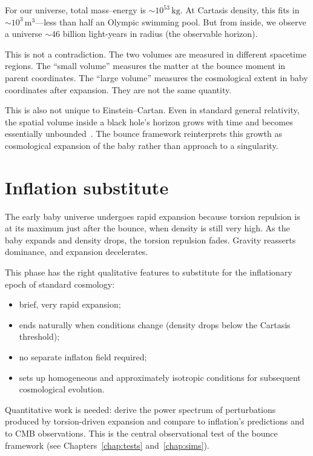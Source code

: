 For our universe, total mass--energy is $\sim 10^{53}\,\mathrm{kg}$. At Cartasis
density, this fits in $\sim 10^{3}\,\mathrm{m^3}$---less than half an Olympic
swimming pool. But from inside, we observe a universe $\sim 46$ billion
light-years in radius (the observable horizon).

This is not a contradiction. The two volumes are measured in different spacetime
regions. The ``small volume'' measures the matter at the bounce moment in parent
coordinates. The ``large volume'' measures the cosmological extent in baby
coordinates after expansion. They are not the same quantity.

This is also not unique to Einstein--Cartan. Even in standard general relativity,
the spatial volume inside a black hole's horizon grows with time and becomes
essentially unbounded~\citep{christodoulou2015}. The bounce framework
reinterprets this growth as cosmological expansion of the baby rather than
approach to a singularity.

\section{Inflation substitute}

The early baby universe undergoes rapid expansion because torsion repulsion is
at its maximum just after the bounce, when density is still very high. As the
baby expands and density drops, the torsion repulsion fades. Gravity reasserts
dominance, and expansion decelerates.

This phase has the right qualitative features to substitute for the inflationary
epoch of standard cosmology:

\begin{itemize}
  \item brief, very rapid expansion;
  \item ends naturally when conditions change (density drops below the Cartasis threshold);
  \item no separate inflaton field required;
  \item sets up homogeneous and approximately isotropic conditions for subsequent
    cosmological evolution.
\end{itemize}

Quantitative work is needed: derive the power spectrum of perturbations produced
by torsion-driven expansion and compare to inflation's predictions and to CMB
observations. This is the central observational test of the bounce framework
(see Chapters~\ref{chap:tests} and~\ref{chap:sims}).

